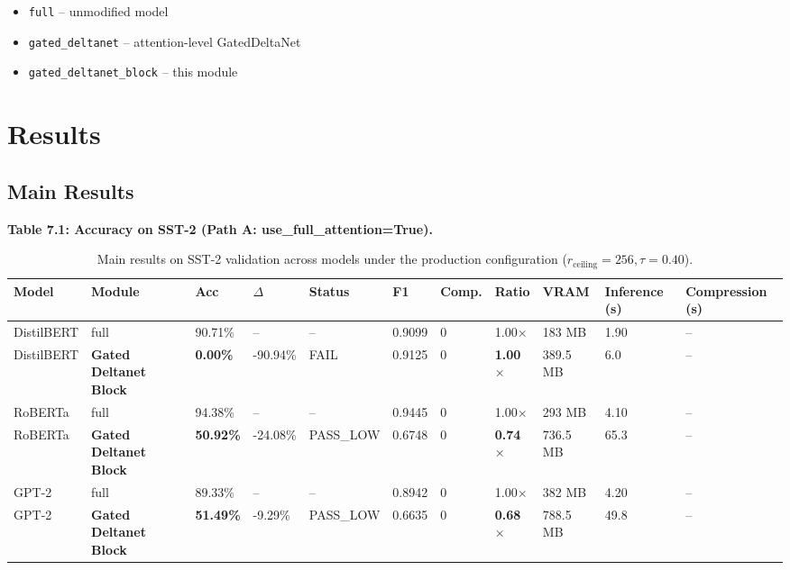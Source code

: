 \begin{itemize}
\item \texttt{full} -- unmodified model
\item \texttt{gated\_deltanet} -- attention-level GatedDeltaNet
\item \texttt{gated\_deltanet\_block} -- this module

\end{itemize}



\section{Results}

\subsection{Main Results}

\textbf{Table 7.1: Accuracy on SST-2 (Path A: use\_full\_attention=True).}

\begin{table}[t]
\centering
\small
\begin{tabular}{lllllllllll}
\toprule
\textbf{Model} & \textbf{Module} & \textbf{Acc} & \textbf{$\Delta$} & \textbf{Status} & \textbf{F1} & \textbf{Comp.} & \textbf{Ratio} & \textbf{VRAM} & \textbf{Inference (s)} & \textbf{Compression (s)} \\
\midrule
DistilBERT & full & 90.71\% & -- & -- & 0.9099 & 0 & 1.00$\times$ & 183 MB & 1.90 & -- \\
DistilBERT & \textbf{Gated Deltanet Block} & \textbf{0.00\%} & -90.94\% & FAIL & 0.9125 & 0 & \textbf{1.00$\times$} & 389.5 MB & 6.0 & -- \\
RoBERTa & full & 94.38\% & -- & -- & 0.9445 & 0 & 1.00$\times$ & 293 MB & 4.10 & -- \\
RoBERTa & \textbf{Gated Deltanet Block} & \textbf{50.92\%} & -24.08\% & PASS\_LOW & 0.6748 & 0 & \textbf{0.74$\times$} & 736.5 MB & 65.3 & -- \\
GPT-2 & full & 89.33\% & -- & -- & 0.8942 & 0 & 1.00$\times$ & 382 MB & 4.20 & -- \\
GPT-2 & \textbf{Gated Deltanet Block} & \textbf{51.49\%} & -9.29\% & PASS\_LOW & 0.6635 & 0 & \textbf{0.68$\times$} & 788.5 MB & 49.8 & -- \\
\bottomrule
\end{tabular}
\caption{Main results on SST-2 validation across models under the production configuration ($r_{\mathrm{ceiling}}=256, \tau=0.40$).}
\label{tab:main_sst2}
\end{table}

